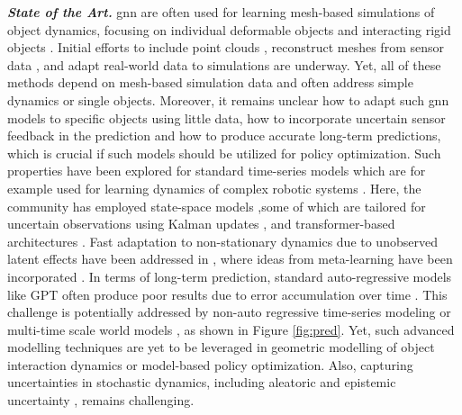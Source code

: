 \documentclass{erc-B2}
\begin{document}
\textit{\textbf{State of the Art.}} \gls*{gnn} are often used for learning mesh-based simulations of object dynamics, focusing on individual deformable objects \cite{pfaff2021learning} and interacting rigid objects \cite{allen2023learning}. Initial efforts to include point clouds \cite{linkerhagnerFSM23, shi2023robocook}, reconstruct meshes from sensor data \cite{longhini2023edo}, and adapt real-world data to simulations \cite{sundaresan2022diffcloud, antonova2022bayesian} are underway. Yet, all of these methods depend on mesh-based simulation data and often address simple dynamics or single objects. Moreover, it remains unclear how to adapt such \gls*{gnn} models to specific objects using little data, how to incorporate uncertain sensor feedback in the prediction and how to produce accurate long-term predictions, which is crucial if such models should be utilized for policy optimization. 
Such properties have been explored for standard time-series models which are for example used for learning dynamics of complex robotic systems \cite{shaj2020acrkn}. Here, the community has employed state-space models \cite{gu2021efficiently, smith2022simplified, becker19RKN},some of which are tailored for uncertain observations using Kalman updates \cite{kalman1960,becker19RKN}, and transformer-based architectures \cite{vaswani2017attention,zhou2021informer,liu2022Transformer}. Fast adaptation to non-stationary dynamics due to unobserved latent effects have been addressed in \cite{shaj2022hiprssm,liu2022Transformer}, where ideas from meta-learning have been incorporated \cite{shaj2022hiprssm}. In terms of long-term prediction, standard auto-regressive models like GPT often produce poor results due to error accumulation over time \cite{lecun2022path,zeng2018learning}. This challenge is potentially addressed by non-auto regressive time-series modeling \cite{Zeng2022AreTE} or multi-time scale world models \cite{shaj2023mts3}, as shown in Figure \ref{fig:pred}. %
Yet, such advanced modelling techniques  are yet to be leveraged in geometric modelling of  object interaction dynamics  or model-based policy optimization. Also, capturing uncertainties in stochastic dynamics, including aleatoric \cite{becker19RKN} and epistemic uncertainty \cite{chua2018deep,becker2022uncertainty}, remains challenging.  %
\end{document}
